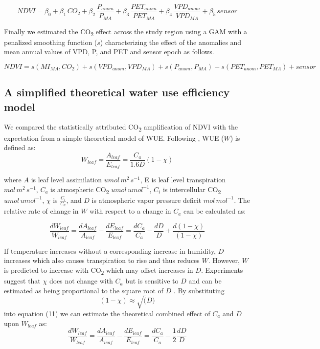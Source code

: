 \documentclass[gc, manuscript]{copernicus}
\begin{document}
\begin{equation}
NDVI=\beta_0+ \beta_1\,CO_2+\beta_2\,\frac{P_{anom}}{P_{MA}}+\beta_3\,\frac{PET_{anom}}{PET_{MA}}+\beta_4\,\frac{VPD_{anom}}{{VPD_{MA}}}+\beta_5\,sensor
\end{equation}

Finally we estimated the CO\textsubscript{2} effect across the study
region using a GAM with a penalized smoothing function (\(s\))
characterizing the effect of the anomalies and mean annual values of
VPD, P, and PET and sensor epoch as follows.

\begin{equation}
NDVI = s(MI_{MA},CO_2) + s(VPD_{anom},VPD_{MA})+s(P_{anom},P_{MA})+s(PET_{anom},PET_{MA})+sensor
\end{equation}

\subsection{A simplified theoretical water use efficiency model}

We compared the statistically attributed CO\textsubscript{2}
amplification of NDVI with the expectation from a simple theoretical
model of WUE. Following \citet{donohueImpactCOFertilization2013b}, WUE
(\(W\)) is defined as: \begin{equation}
W_{leaf} = \frac{A_{leaf}}{E_{leaf}} = \frac{C_a}{1.6D}(1 - \chi)
\end{equation}

where \(A\) is leaf level assimilation \(umol\,m^{2}\,s^{-1}\), E is
leaf level transpiration \(mol\,m^{2}\,s^{-1}\), \(C_a\) is atmospheric
CO\textsubscript{2} \(umol\,umol^{-1}\), \(C_i\) is intercellular
CO\textsubscript{2} \(umol\,umol^{-1}\), \(\chi\) is
\(\frac{C_i}{C_a}\), and \(D\) is atmospheric vapor pressure deficit
\(mol\,mol^{-1}\). The relative rate of change in \(W\) with respect to
a change in \(C_a\) can be calculated as:

\begin{equation}
\frac{dW_{leaf}}{W_{leaf}}=\frac{dA_{leaf}}{A_{leaf}} - \frac{dE_{leaf}}{E_{leaf}} = \frac{dC_a}{C_a} - \frac{dD}{D} + \frac{d(1-\chi)}{(1-\chi)}
\end{equation}

If temperature increases without a corresponding increase in humidity,
\(D\) increases which also causes transpiration to rise and thus reduces
\(W\). However, \(W\) is predicted to increase with CO\textsubscript{2}
which may offset increases in \(D\). Experiments suggest that \(\chi\)
does not change with \(C_a\) but is sensitive to \(D\)
\citep{wong_etal85, drake_etal97} and can be estimated as being
proportional to the square root of \(D\)
\citep{medlynReconcilingOptimalEmpirical2011d}. By substituting
\[(1-\chi) \approx \sqrt(D)\] into equation (11) we can estimate the
theoretical combined effect of \(C_a\) and \(D\) upon \(W_{leaf}\) as:
\begin{equation}
\frac{dW_{leaf}}{W_{leaf}}=\frac{dA_{leaf}}{A_{leaf}} - \frac{dE_{leaf}}{E_{leaf}} = \frac{dC_a}{C_a} - \frac{1}{2}\frac{dD}{D}
\end{equation}
\end{document}
